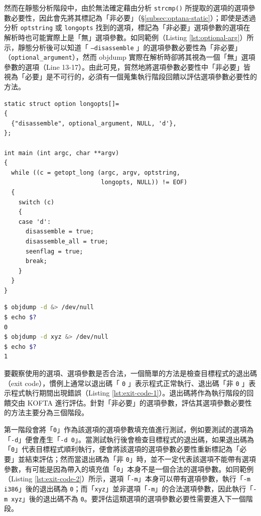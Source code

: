 然而在靜態分析階段中，由於無法確定藉由分析 \texttt{strcmp()} 所提取的選項的選項參數必要性，因此會先將其標記為「非必要」（\S \ref{subsec:optana-static}）；即使是透過分析 \texttt{optstring} 或 \texttt{longopts} 找到的選項，標記為「非必要」選項參數的選項在解析時也可能實際上是「無」選項參數。如同範例（Listing \ref{lst:optional-arg}）所示，靜態分析後可以知道「 \texttt{--disassemble} 」的選項參數必要性為「非必要」（\texttt{optional\_argument}），然而 objdump 實際在解析時卻將其視為一個「無」選項參數的選項（Line 13-17）。由此可見，貿然地將選項參數必要性中「非必要」皆視為「必要」是不可行的，必須有一個蒐集執行階段回饋以評估選項參數必要性的方法。

\begin{lstlisting}[caption=\texttt{objdump} 非必要選項參數範例, label=lst:optional-arg]
static struct option longopts[]=
{
  {"disassemble", optional_argument, NULL, 'd'},
};

int main (int argc, char **argv)
{
  while ((c = getopt_long (argc, argv, optstring,
                           longopts, NULL)) != EOF)
  {
    switch (c)
    {
    case 'd':
      disassemble = true;
      disassemble_all = true;
      seenflag = true;
      break;
    }
  }
}
\end{lstlisting}

\begin{lstlisting}[language=sh, caption=程式退出碼範例一, label=lst:exit-code-1]
$ objdump -d &> /dev/null 
$ echo $?                                
0
$ objdump -d xyz &> /dev/null
$ echo $?                                    
1
\end{lstlisting}

要觀察使用的選項、選項參數是否合法，一個簡單的方法是檢查目標程式的退出碼（exit code），慣例上通常以退出碼「 \texttt{0} 」表示程式正常執行、退出碼「非 \texttt{0} 」表示程式執行期間出現錯誤（Listing \ref{lst:exit-code-1}）。退出碼將作為執行階段的回饋交由 KOFTA 進行評估。針對「非必要」的選項參數，評估其選項參數必要性的方法主要分為三個階段。

第一階段會將「\texttt{0}」作為該選項的選項參數填充值進行測試，例如要測試的選項為「\texttt{-d}」便會產生「\texttt{-d 0}」。當測試執行後會檢查目標程式的退出碼，如果退出碼為「\texttt{0}」代表目標程式順利執行，便會將該選項的選項參數必要性重新標記為「必要」並結束評估；然而當退出碼為「非 \texttt{0}」時，並不一定代表該選項不能帶有選項參數，有可能是因為帶入的填充值「\texttt{0}」本身不是一個合法的選項參數。如同範例（Listing \ref{lst:exit-code-2}）所示，選項「\texttt{-m}」本身可以帶有選項參數，執行「\texttt{-m i386}」後的退出碼為 \texttt{0}；而「\texttt{xyz}」並非選項「\texttt{-m}」的合法選項參數，因此執行「\texttt{-m xyz}」後的退出碼不為 \texttt{0}。要評估這類選項的選項參數必要性需要進入下一個階段。

